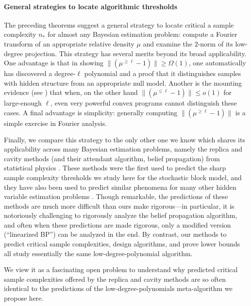 \paragraph{General strategies to locate algorithmic thresholds}
The preceding theorems suggest a general strategy to locate critical a sample complexity $n_*$ for almost any Bayesian estimation problem: compute a Fourier transform of an appropriate relative density $\mu$ and examine the $2$-norm of its low-degree projection.
This strategy has several merits beyond its broad applicability.
One advantage is that in showing $\|(\mu^{\geq \ell} -1)\| \geq \Omega(1)$, one automatically has discovered a degree-$\ell$ polynomial and a proof that it distinguishes samples with hidden structure from an appropriate null model.
Another is the mounting evidence (see \cite{DBLP:conf/focs/BarakHKKMP16, soslb}) that when, on the other hand $\|(\mu^{\leq \ell} -1)\| \leq o(1)$ for large-enough $\ell$, even very powerful convex programs cannot distinguish these cases.
A final advantage is simplicity: generally computing $\|(\mu^{\geq \ell}-1)\|$ is a simple exercise in Fourier analysis.

Finally, we compare this strategy to the only other one we know which shares its applicability across many Bayesian estimation problems, namely the replica and cavity methods (and their attendant algorithm, belief propagation) from statistical physics \cite{mezard2009information}.
These methods were the first used to predict the sharp sample complexity thresholds we study here for the stochastic block model, and they have also been used to predict similar phenomena for many other hidden variable estimation problems \cite{DBLP:conf/allerton/LesieurBBKMZ16, DBLP:conf/allerton/LesieurBBKMZ16, DBLP:conf/allerton/LesieurBBKMZ16}.
Though remarkable, the predictions of these methods are much more difficult than ours make rigorous---in particular, it is notoriously challenging to rigorously analyze the belief propagation algorithm, and often when these predictions are made rigorous, only a modified version (``linearized BP'') can be analyzed in the end.
By contrast, our methods to predict critical sample complexities, design algorithms, and prove lower bounds all study essentially the same low-degree-polynomial algorithm.

We view it as a fascinating open problem to understand why predicted critical sample complexities offered by the replica and cavity methods are so often identical to the predictions of the low-degree-polynomials meta-algorithm we propose here.

\Dcomment{}

%
%

%



%
%


%
%
%

\Dnote{}
